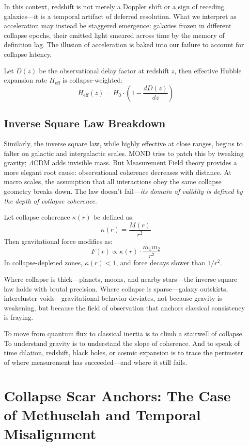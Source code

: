 In this context, redshift is not merely a Doppler shift or a sign of receding galaxies—it is a temporal artifact of deferred resolution. What we interpret as acceleration may instead be staggered emergence: galaxies frozen in different collapse epochs, their emitted light smeared across time by the memory of definition lag. The illusion of acceleration is baked into our failure to account for collapse latency.

Let $D(z)$ be the observational delay factor at redshift $z$, then effective Hubble expansion rate $H_\text{eff}$ is collapse-weighted:
\[
H_\text{eff}(z) = H_0 \cdot \left( 1 - \frac{dD(z)}{dz} \right)
\]

\subsection{Inverse Square Law Breakdown}

Similarly, the inverse square law, while highly effective at close ranges, begins to falter on galactic and intergalactic scales. MOND tries to patch this by tweaking gravity; $\Lambda$CDM adds invisible mass. But Measurement Field theory provides a more elegant root cause: observational coherence decreases with distance. At macro scales, the assumption that all interactions obey the same collapse geometry breaks down. The law doesn’t fail—\textit{its domain of validity is defined by the depth of collapse coherence.}

Let collapse coherence $\kappa(r)$ be defined as:
\[
\kappa(r) = \frac{M(r)}{r^2}
\]
Then gravitational force modifies as:
\[
F(r) \propto \kappa(r) \cdot \frac{m_1 m_2}{r^2}
\]
In collapse-depleted zones, $\kappa(r) < 1$, and force decays slower than $1/r^2$.

Where collapse is thick—planets, moons, and nearby stars—the inverse square law holds with brutal precision. Where collapse is sparse—galaxy outskirts, intercluster voids—gravitational behavior deviates, not because gravity is weakening, but because the field of observation that anchors classical consistency is fraying.

To move from quantum flux to classical inertia is to climb a stairwell of collapse. To understand gravity is to understand the slope of coherence. And to speak of time dilation, redshift, black holes, or cosmic expansion is to trace the perimeter of where measurement has succeeded—and where it still fails.

\section{Collapse Scar Anchors: The Case of Methuselah and Temporal Misalignment}

